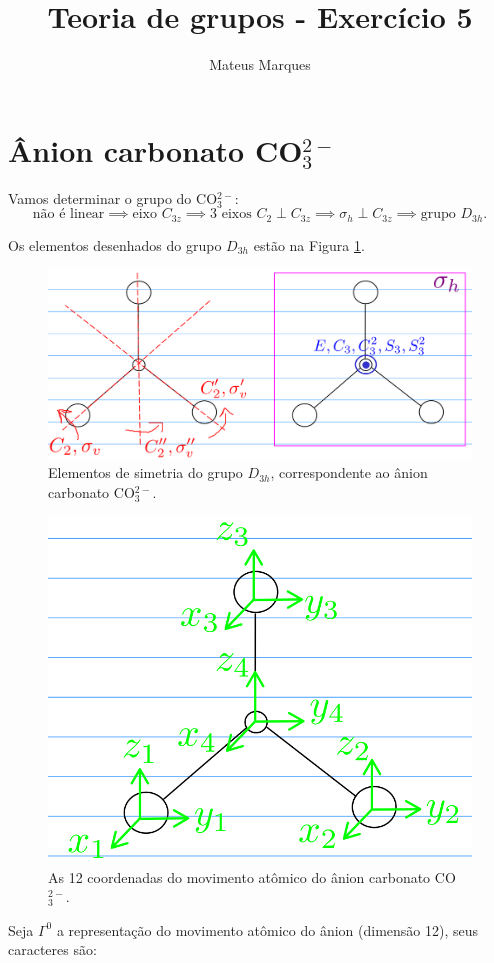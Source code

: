 \documentclass[a4paper,10pt]{article}
\title{\Huge{\textbf{Teoria de grupos - Exercício 5}}}
\author{Mateus Marques}
\begin{document}
\maketitle

\section*{Ânion carbonato CO$_3^{2-}$}

Vamos determinar o grupo do CO$_3^{2-}$:
$$
\text{não é linear} \implies \text{eixo }C_{3z} \implies
\text{3 eixos }C_2 \perp C_{3z} \implies
\sigma_h \perp C_{3z} \implies \boxed{ \text{grupo }D_{3h}. }
$$

Os elementos desenhados do grupo $D_{3h}$ estão na Figura \ref{fig:D3h}.
\begin{figure}[H]
\centering
\includegraphics[height=0.32\linewidth]{fig/D3h_my.png}
\caption{Elementos de simetria do grupo $D_{3h}$, correspondente ao ânion carbonato CO$_3^{2-}$.}
\label{fig:D3h}
\end{figure}

\begin{figure}[H]
\centering
\includegraphics[height=0.32\linewidth]{fig/mov_atom.png}
\caption{As 12 coordenadas do movimento atômico do ânion carbonato CO$_3^{2-}$.}
\label{fig:mov_atom}
\end{figure}

Seja $\Gamma^0$ a representação do movimento atômico do ânion (dimensão 12), seus caracteres são:
\end{document}
